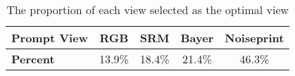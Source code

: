 \begin{table}[t!]
\caption{The proportion of each view selected as the optimal view}
\label{tab:my-table-3}
\centering
\begin{tabular}{@{}lcccc@{}}
\toprule
\textbf{Prompt View} & \textbf{RGB} & \textbf{SRM} & \textbf{Bayer} & \textbf{Noiseprint} \\
\midrule
\textbf{Percent} & 13.9\% & 18.4\% & 21.4\% & 46.3\% \\
\bottomrule
\end{tabular}
\end{table}
